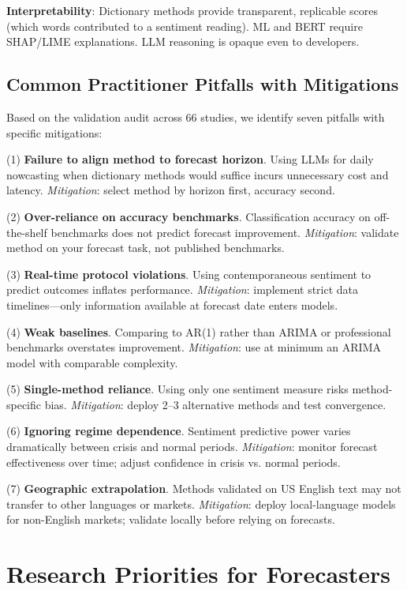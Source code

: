 \documentclass[11pt]{article}
\begin{document}
\noindent\textbf{Interpretability}: Dictionary methods provide transparent, replicable scores (which words contributed to a sentiment reading). ML and BERT require SHAP/LIME explanations. LLM reasoning is opaque even to developers.

\subsection{Common Practitioner Pitfalls with Mitigations}

Based on the validation audit across 66 studies, we identify seven pitfalls with specific mitigations:

\noindent (1) \textbf{Failure to align method to forecast horizon}. Using LLMs for daily nowcasting when dictionary methods would suffice incurs unnecessary cost and latency. \textit{Mitigation}: select method by horizon first, accuracy second.

\noindent (2) \textbf{Over-reliance on accuracy benchmarks}. Classification accuracy on off-the-shelf benchmarks does not predict forecast improvement. \textit{Mitigation}: validate method on your forecast task, not published benchmarks.

\noindent (3) \textbf{Real-time protocol violations}. Using contemporaneous sentiment to predict outcomes inflates performance. \textit{Mitigation}: implement strict data timelines---only information available at forecast date enters models.

\noindent (4) \textbf{Weak baselines}. Comparing to AR(1) rather than ARIMA or professional benchmarks overstates improvement. \textit{Mitigation}: use at minimum an ARIMA model with comparable complexity.

\noindent (5) \textbf{Single-method reliance}. Using only one sentiment measure risks method-specific bias. \textit{Mitigation}: deploy 2--3 alternative methods and test convergence.

\noindent (6) \textbf{Ignoring regime dependence}. Sentiment predictive power varies dramatically between crisis and normal periods. \textit{Mitigation}: monitor forecast effectiveness over time; adjust confidence in crisis vs. normal periods.

\noindent (7) \textbf{Geographic extrapolation}. Methods validated on US English text may not transfer to other languages or markets. \textit{Mitigation}: deploy local-language models for non-English markets; validate locally before relying on forecasts.

\section{Research Priorities for Forecasters}
\end{document}
